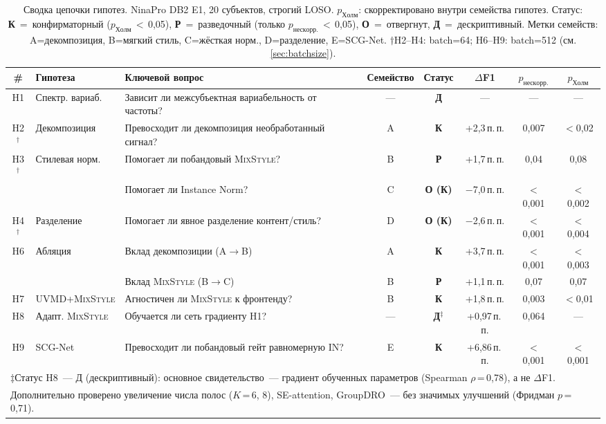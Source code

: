 \documentclass[conference]{IEEEtran}
\newcommand{\pp}{\,п.\,п.}
\newcommand{\mixstyle}{\textsc{MixStyle}}
\newcommand{\uvmd}{\textsc{UVMD}}
\begin{document}
\begin{table}[t]
\centering
\caption{Сводка цепочки гипотез. NinaPro DB2 E1, 20 субъектов, строгий LOSO. $p_{\mathrm{Холм}}$: скорректировано внутри семейства гипотез. Статус: \textbf{К}~=~конфирматорный ($p_{\mathrm{Холм}}$\,$<$\,0,05), \textbf{Р}~=~разведочный (только $p_{\mathrm{нескорр.}}$\,$<$\,0,05), \textbf{О}~=~отвергнут, \textbf{Д}~=~дескриптивный. Метки семейств: A=декомпозиция, B=мягкий стиль, C=жёсткая норм., D=разделение, E=SCG-Net. $\dagger$H2--H4: batch=64; H6--H9: batch=512 (см. \cref{sec:batchsize}).}
\label{tab:hypotheses}
\begin{tabular}{clp{4.8cm}ccccc}
\toprule
\# & Гипотеза & Ключевой вопрос & Семейство & Статус & $\Delta$F1 & $p_{\mathrm{нескорр.}}$ & $p_{\mathrm{Холм}}$ \\
\midrule
H1 & Спектр. вариаб. & Зависит ли межсубъектная вариабельность от частоты? & --- & \textbf{Д} & --- & --- & --- \\
H2$^\dagger$ & Декомпозиция & Превосходит ли декомпозиция необработанный сигнал? & A & \textbf{К} & +2,3\pp{} & 0,007 & $<$0,02 \\
H3$^\dagger$ & Стилевая норм. & Помогает ли побандовый \mixstyle{}? & B & \textbf{Р} & +1,7\pp{} & 0,04 & 0,08 \\
   &                 & Помогает ли Instance Norm? & C & \textbf{О (К)} & $-$7,0\pp{} & $<$0,001 & $<$0,002 \\
H4$^\dagger$ & Разделение & Помогает ли явное разделение контент/стиль? & D & \textbf{О (К)} & $-$2,6\pp{} & $<$0,001 & $<$0,004 \\
H6 & Абляция & Вклад декомпозиции (A$\to$B) & A & \textbf{К} & +3,7\pp{} & $<$0,001 & $<$0,003 \\
   &         & Вклад \mixstyle{} (B$\to$C) & B & \textbf{Р} & +1,1\pp{} & 0,07 & 0,07 \\
H7 & \uvmd{}+\mixstyle{} & Агностичен ли \mixstyle{} к фронтенду? & B & \textbf{К} & +1,8\pp{} & 0,003 & $<$0,01 \\
H8 & Адапт. \mixstyle{} & Обучается ли сеть градиенту H1? & --- & \textbf{Д$^{\ddagger}$} & +0,97\pp{} & 0,064 & --- \\
H9 & SCG-Net & Превосходит ли побандовый гейт равномерную IN? & E & \textbf{К} & +6,86\pp{} & $<$0,001 & $<$0,001 \\
\bottomrule
\multicolumn{8}{l}{\footnotesize $\ddagger$Статус H8~--- Д (дескриптивный): основное свидетельство~--- градиент обученных параметров (Spearman $\rho$\,=\,0,78), а не $\Delta$F1.} \\
\multicolumn{8}{l}{\footnotesize Дополнительно проверено увеличение числа полос ($K$\,=\,6, 8), SE-attention, GroupDRO~--- без значимых улучшений (Фридман $p$\,=\,0,71).}
\end{tabular}
\end{table}
\end{document}
